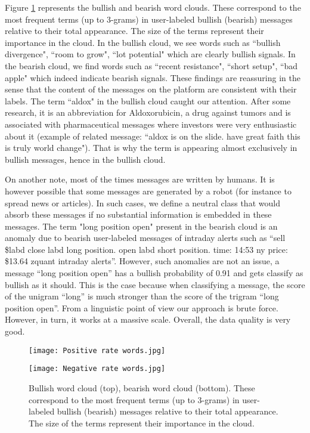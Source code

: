 Figure \ref{wordclouds} represents the bullish and bearish word clouds. These correspond to the most frequent terms (up to 3-grams) in user-labeled bullish (bearish) messages relative to their total appearance. The size of the terms represent their importance in the cloud. In the bullish cloud, we see words such as ``bullish divergence", ``room to grow", ``lot potential" which are clearly bullish signals. In the bearish cloud, we find words such as ``recent resistance", ``short setup", ``bad apple" which indeed indicate bearish signals. These findings are reassuring in the sense that the content of the messages on the platform are consistent with their labels. The term ``aldox" in the bullish cloud caught our attention. After some research, it is an abbreviation for Aldoxorubicin, a drug against tumors and is associated with pharmaceutical messages where investors were very enthusiastic about it (example of related message: ``aldox is on the slide. have great faith this is truly world change"). That is why the term is appearing almost exclusively in bullish messages, hence in the bullish cloud.

On another note, most of the times messages are written by humans. It is however possible that some messages are generated by a robot (for instance to spread news or articles). In such cases, we define a neutral class that would absorb these messages if no substantial information is embedded in these messages. The term "long position open" present in the bearish cloud is an anomaly due to bearish user-labeled messages of intraday alerts such as “sell \$labd close labd long position. open labd short position. time: 14:53 ny price: \$13.64 zquant intraday alerts”. However, such anomalies are not an issue, a message “long position open” has a bullish probability of 0.91 and gets classify as bullish as it should. This is the case because when classifying a message, the score of the unigram “long” is much stronger than the score of the trigram “long position open”. From a linguistic point of view our approach is brute force. However, in turn, it works at a massive scale. Overall, the data quality is very good.


\begin{figure}
\begin{center}
    \texttt{[image: Positive rate words.jpg]}

    \vspace{1cm}

    \texttt{[image: Negative rate words.jpg]}
   \vspace{0.1cm}
    \caption{Bullish word cloud (top), bearish word cloud (bottom). These correspond to the most frequent terms (up to 3-grams) in user-labeled bullish (bearish) messages relative to their total appearance. The size of the terms represent their importance in the cloud.}
    \label{wordclouds}
  \end{center}
\end{figure}


